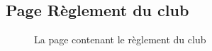 \documentclass{article}[12pt]
\begin{document}
     \subsection{Page Règlement du club}
     \begin{figure}[H]
     	\centering
     	\caption{La page contenant le règlement du club}
     \end{figure}
\end{document}
